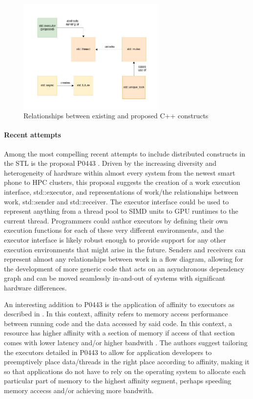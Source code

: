 \begin{figure}[h]
\centering
\includegraphics[width=0.65\textwidth]{Figures/cpp_firstclass.jpg}
\caption{Relationships between existing and proposed C++ constructs}
\label{fig:cpp_firstclass}
\end{figure}

\paragraph{Recent attempts}
Among the most compelling recent attempts to include distributed constructs in the STL is the proposal P0443 \cite{p0443}. Driven by the increasing diversity and heterogeneity of hardware within almost every system from the newest smart phone to HPC clusters, this proposal suggests the creation of a work execution interface, std::executor, and representations of work/the relationships between work, std::sender and std::receiver. The executor interface could be used to represent anything from a thread pool to SIMD units to GPU runtimes to the current thread. Programmers could author executors by defining their own execution functions for each of these very different environments, and the executor interface is likely robust enough to provide support for any other execution environments that might arise in the future. Senders and receivers can represent almost any relationships between work in a flow diagram, allowing for the development of more generic code that acts on an asynchronous dependency graph and can be moved seamlessly in-and-out of systems with significant hardware differences. 

An interesting addition to P0443 is the application of affinity to executors as described in \cite{towards_dist_cpp}. In this context, affinity refers to memory access performance between running code and the data accessed by said code. In this context, a resource has higher affinity with a section of memory if access of that section comes with lower latency and/or higher bandwith \cite{towards_dist_cpp}. The authors suggest tailoring the executors detailed in P0443 to allow for application developers to preemptively place data/threads in the right place according to affinity, making it so that applications do not have to rely on the operating system to allocate each particular part of memory to the highest affinity segment, perhaps speeding memory accecss and/or achieving more bandwith. 

